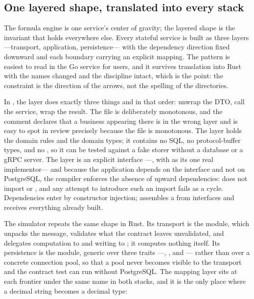 \subsection{One layered shape, translated into every stack}

The formula engine is one service's center of gravity; the layered shape is the invariant that
holds everywhere else. Every stateful service is built as three layers —transport, application,
persistence— with the dependency direction fixed downward and each boundary carrying an explicit
mapping. The pattern is easiest to read in the Go service for users, and it survives translation
into Rust with the names changed and the discipline intact, which is the point: the constraint is
the direction of the arrows, not the spelling of the directories.

In , the  layer does exactly three things and in that order: unwrap the
DTO, call the service, wrap the result. The file is deliberately monotonous, and the comment
declares that a business  appearing there is in the wrong layer and is easy to spot in
review precisely because the file is monotonous. The  layer holds the domain rules
and the domain types; it contains no SQL, no protocol-buffer types, and no , so it
can be tested against a fake storer without a database or a gRPC server. The  layer
is an explicit interface —, with  as its one real
implementor— and because the application depends on the interface and not on PostgreSQL, the
compiler enforces the absence of upward dependencies:  does not import 
or , and any attempt to introduce such an import fails as a cycle. Dependencies
enter by constructor injection;  assembles a  from interfaces and
receives everything already built.

The simulator repeats the same shape in Rust. Its transport is the  module, which
unpacks the message, validates what the contract leaves unvalidated, and delegates computation to
 and writing to ; it computes nothing itself. Its persistence is the
 module, generic over three traits —, , and
— rather than over a concrete connection pool, so that a pool never becomes
visible to the transport and the contract test can run without PostgreSQL. The mapping layer sits
at each frontier under the same name in both stacks, and it is the only place where a decimal
string becomes a decimal type:

